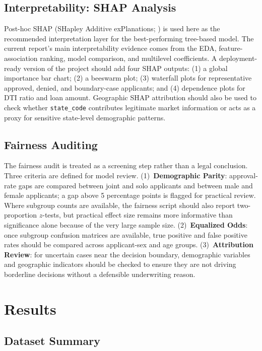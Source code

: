 \documentclass[12pt,letterpaper]{article}
\begin{document}
\subsection{Interpretability: SHAP Analysis}
\label{sec:shap}

Post-hoc SHAP (SHapley Additive exPlanations; \citealt{lundberg2017}) is used here as the
recommended interpretation layer for the best-performing tree-based model. The current report's
main interpretability evidence comes from the EDA, feature-association ranking, model comparison,
and multilevel coefficients. A deployment-ready version of the project should add four SHAP
outputs: (1) a global importance bar chart; (2) a beeswarm plot; (3) waterfall plots for
representative approved, denied, and boundary-case applicants; and (4) dependence plots for DTI
ratio and loan amount. Geographic SHAP attribution should also be used to check whether
\texttt{state\_code} contributes legitimate market information or acts as a proxy for sensitive
state-level demographic patterns.
\subsection{Fairness Auditing}
\label{sec:fairness}

The fairness audit is treated as a screening step rather than a legal conclusion. Three criteria
are defined for model review. (1)~\textbf{Demographic Parity}: approval-rate gaps are compared
between joint and solo applicants and between male and female applicants; a gap above 5 percentage
points is flagged for practical review. Where subgroup counts are available, the fairness script
should also report two-proportion $z$-tests, but practical effect size remains more informative
than significance alone because of the very large sample size. (2)~\textbf{Equalized Odds}: once
subgroup confusion matrices are available, true positive and false positive rates should be
compared across applicant-sex and age groups. (3)~\textbf{Attribution Review}: for uncertain cases
near the decision boundary, demographic variables and geographic indicators should be checked to
ensure they are not driving borderline decisions without a defensible underwriting reason.
\section{Results}

\subsection{Dataset Summary}
\end{document}

